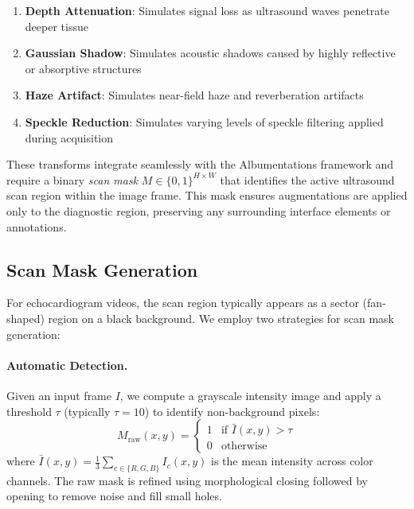 \documentclass{article}
\theoremstyle{plain}
\theoremstyle{definition}
\theoremstyle{remark}
\begin{document}
\begin{enumerate}
    \item \textbf{Depth Attenuation}: Simulates signal loss as ultrasound waves penetrate deeper tissue
    \item \textbf{Gaussian Shadow}: Simulates acoustic shadows caused by highly reflective or absorptive structures
    \item \textbf{Haze Artifact}: Simulates near-field haze and reverberation artifacts
    \item \textbf{Speckle Reduction}: Simulates varying levels of speckle filtering applied during acquisition
\end{enumerate}

These transforms integrate seamlessly with the Albumentations framework \cite{albumentations2020} and require a binary \textit{scan mask} $M \in \{0, 1\}^{H \times W}$ that identifies the active ultrasound scan region within the image frame. This mask ensures augmentations are applied only to the diagnostic region, preserving any surrounding interface elements or annotations.

\subsection{Scan Mask Generation}

For echocardiogram videos, the scan region typically appears as a sector (fan-shaped) region on a black background. We employ two strategies for scan mask generation:

\paragraph{Automatic Detection.} Given an input frame $I$, we compute a grayscale intensity image and apply a threshold $\tau$ (typically $\tau = 10$) to identify non-background pixels:
\begin{equation}
    M_{\text{raw}}(x, y) = \begin{cases}
        1 & \text{if } \bar{I}(x,y) > \tau \\
        0 & \text{otherwise}
    \end{cases}
\end{equation}
where $\bar{I}(x,y) = \frac{1}{3}\sum_{c \in \{R,G,B\}} I_c(x,y)$ is the mean intensity across color channels. The raw mask is refined using morphological closing followed by opening to remove noise and fill small holes.
\end{document}
